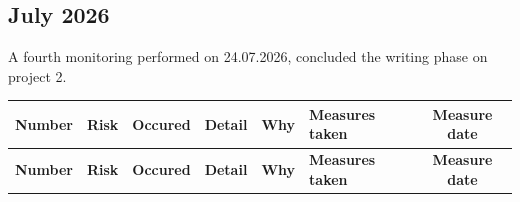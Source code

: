 \begin{landscape}
\subsection*{July 2026 }
A fourth monitoring performed on 24.07.2026, concluded the writing phase on project 2.



\begin{longtable}{|c|p{4cm}|c|p{3cm}|p{3cm}|p{3cm}|c|}
\hline
\textbf{Number} & \textbf{Risk} & \textbf{Occured} & \textbf{Detail} & \textbf{Why} & \textbf{Measures taken} & \textbf{Measure date} \\ \hline
\endfirsthead

\hline
\textbf{Number} & \textbf{Risk} & \textbf{Occured} & \textbf{Detail} & \textbf{Why} & \textbf{Measures taken} & \textbf{Measure date} \\ \hline
\endhead


\end{longtable}
\end{landscape}
